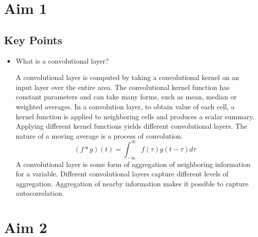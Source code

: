 \documentclass{article}
\begin{document}
\section{Aim 1}
\subsection{Key Points}
\begin{itemize}
    \item What is a convolutional layer? {
    
    A convolutional layer is computed by taking a convolutional kernel on an input layer over the entire area. The convolutional kernel function has constant parameters and can take many forms, such as mean, median or weighted averages. In a convolution layer, to obtain value of each cell, a kernel function is applied to neighboring cells and produces a scalar summary. Applying different kernel functions yields different convolutional layers. The nature of a moving average is a process of convolution. 
    \begin{equation*}
        (f*g)(t)=\int_{-\infty}^{\infty}f(\tau)g(t-\tau)d\tau
    \end{equation*}
    A convolutional layer is some form of aggregation of neighboring information for a variable. Different convolutional layers capture different levels of aggregation. Aggregation of nearby information makes it possible to capture autocorrelation. 
    }
\end{itemize}

\section{Aim 2}
\end{document}

